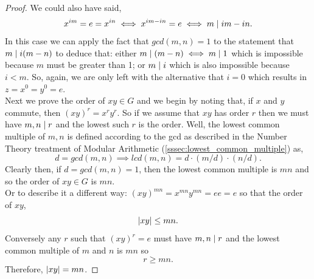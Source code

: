 \documentclass[MathsNotesBase.tex]{subfiles}
\begin{document}
{\begin{proof}
		We could also have said,
		\[ x^{im} = e = x^{in} \iff x^{im - in} = e \iff m \mid im - in. \]
		In this case we can apply the fact that ${ gcd(m,n) = 1 }$ to the statement that ${ m \mid i(m-n) }$ to deduce that: either ${  m \mid (m-n) \iff m \mid 1 }$ which is impossible because $m$ must be greater than 1; or ${ m \mid i }$ which is also impossible because ${ i < m }$. So, again, we are only left with the alternative that ${ i = 0 }$ which results in ${ z = x^0 = y^0 = e }$.\\
		
		Next we prove the order of ${ xy \in G }$ and we begin by noting that, if $x$ and $y$ commute, then ${ (xy)^r = x^ry^r }$. So if we assume that $xy$ has order $r$ then we must have ${ m,n \mid r }$ and the lowest such $r$ is the order. Well, the lowest common multiple of ${ m,n }$ is defined according to the gcd as described in the Number Theory treatment of Modular Arithmetic (\ref{sssec:lowest_common_multiple}) as,
		\[ d = gcd(m,n) \implies lcd(m,n) = d \cdot (m/d) \cdot (n/d). \]
		Clearly then, if ${ d = gcd(m,n) = 1 }$, then the lowest common multiple is ${ mn }$ and so the order of ${ xy \in G }$ is ${ mn }$.\\
		
		Or to describe it a different way: ${ (xy)^{mn} = x^{mn}y^{mn} = ee = e }$ so that the order of $xy$,
		\[ \left\lvert xy\right\rvert \leq mn. \]
		Conversely any $r$ such that ${ (xy)^r = e }$ must have ${ m,n \mid r }$ and the lowest common multiple of $m$ and $n$ is $mn$ so
		\[ r \geq mn. \]
		Therefore, ${ \left\lvert xy\right\rvert = mn }$.			
	\end{proof}

	\bigskip
}
\end{document}
